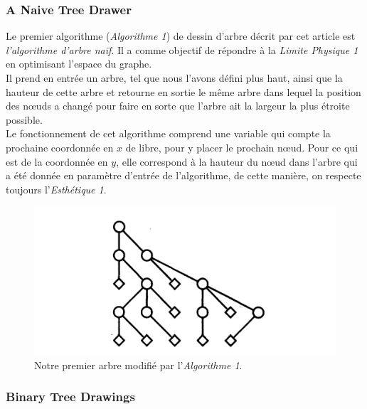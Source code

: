 \documentclass{article}
\begin{document}
    \subsubsection{A Naive Tree Drawer}

    Le premier algorithme (\emph{Algorithme 1}) de dessin d'arbre décrit par cet article est \emph{l'algorithme d'arbre naïf}. Il a comme objectif de répondre à la \emph{Limite Physique 1} en optimisant l'espace du graphe.\\

    Il prend en entrée un arbre, tel que nous l'avons défini plus haut, ainsi que la hauteur de cette arbre et retourne en sortie le même arbre dans lequel la position des n\oe{}uds a changé pour faire en sorte que l'arbre ait la largeur la plus étroite possible.\\

    Le fonctionnement de cet algorithme comprend une variable qui compte la prochaine coordonnée en $x$ de libre, pour y placer le prochain n\oe{}ud. Pour ce qui est de la coordonnée en $y$, elle correspond à la hauteur du n\oe{}ud dans l'arbre qui a été donnée en paramètre d'entrée de l'algorithme, de cette manière, on respecte toujours l'\emph{Esthétique 1}.\\

    \vfill
    \begin{figure}[h]
    		\begin{center}
    			\includegraphics[scale=0.4]{arbreNaif.png}
    		\end{center}
    	\caption{Notre premier arbre modifié par l'\emph{Algorithme 1}. \cite{article79}}
      \label{fig:arbreNaif}
    \end{figure}
    \vfill

    \subsubsection{Binary Tree Drawings}
\end{document}
